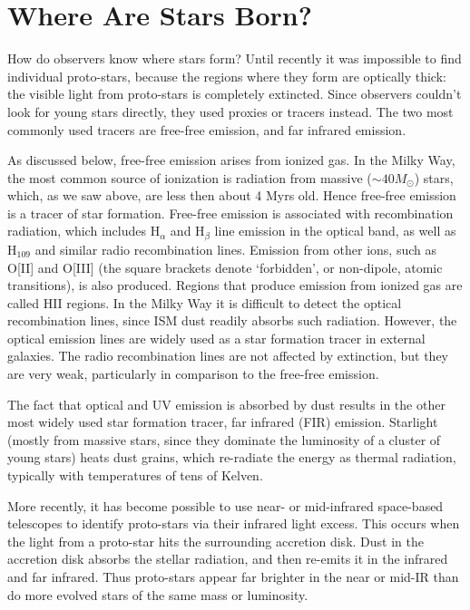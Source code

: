 \documentclass[../dissertation.tex]{subfiles}
\begin{document}
\section{Where Are Stars Born?}
How do observers know where stars form?
Until recently it was impossible to find individual proto-stars, because the regions where they form are optically thick: the visible light from proto-stars is completely extincted. Since observers couldn't look for young stars directly, they used proxies or tracers instead. 
The two most commonly used tracers are free-free emission, and far infrared emission.

As discussed below, free-free emission arises from ionized gas. In the Milky Way, the most common source of ionization is radiation from massive ($\sim 40M_\odot$) stars, which, as we saw above, are less then about 4 Myrs old. Hence free-free emission is a tracer of star formation. Free-free emission is associated with recombination radiation, which includes H$_\alpha$ and H$_\beta$ line emission in the optical band, as well as H$_{109}$ and similar radio recombination lines. Emission from other ions, such as O[II] and O[III] (the square brackets denote `forbidden', or non-dipole, atomic transitions), is also produced. Regions that produce emission from ionized gas are called HII regions. In the Milky Way it is difficult to detect the optical recombination lines, since ISM dust readily absorbs such radiation. However, the optical emission lines are widely used as a star formation tracer in external galaxies. The radio recombination lines are not affected by extinction, but they are very weak, particularly in comparison to the free-free emission. 

The fact that optical and UV emission is absorbed by dust results in the other most widely used star formation tracer, far infrared (FIR) emission. Starlight (mostly from massive stars, since they dominate the luminosity of a cluster of young stars) heats dust grains, which re-radiate the energy as thermal radiation, typically with temperatures of tens of Kelven. 

More recently, it has become possible to use near- or mid-infrared space-based telescopes to identify proto-stars via their infrared light excess. 
This occurs when the light from a proto-star hits the surrounding accretion disk. Dust in the accretion disk absorbs the stellar radiation, and then re-emits it in the infrared and far infrared. Thus proto-stars appear far brighter in the near or mid-IR than do more evolved stars of the same mass or luminosity. 
\end{document}
